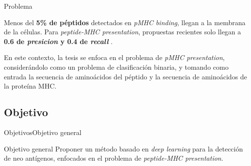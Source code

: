 \documentclass[10pt]{beamer}
\newcommand{\1}{
	\setbeamertemplate{background}{
		\texttt{[image: img/1]}
		\tikz[overlay] \fill[fill opacity=0.75,fill=white] (0,0) rectangle (-\paperwidth,\paperheight);
	}
}
\begin{document}
\begin{frame}{Problema}{}
	
\begin{block}{}
	Menos del \textbf{5\% de péptidos} detectados en \textit{pMHC binding}, llegan a la membrana de la células.  Para \textit{peptide-MHC presentation}, propuestas recientes solo llegan a \textbf{0.6 de \textit{presicion} y 0.4 de \textit{recall}} \cite{mill2022neoms}. 
\end{block}
	


\begin{block}{}
	En este contexto, la tesis se enfoca en el problema de \textit{pMHC presentation}, considerándolo como un problema de clasificación binaria, y tomando como entrada la secuencia de aminoácidos del péptido y la secuencia de aminoácidos de la proteína MHC. 
\end{block}
	
\end{frame}

\subsection{Objetivo}

\begin{frame}{Objetivos}{Objetivo general}	
	\begin{block}{Objetivo general}
		Proponer un método basado en \textit{deep learning} para la detección de neo antígenos, enfocados en el problema de \textit{peptide-MHC presentation}.  
	\end{block}	
\end{frame}

\end{document}
